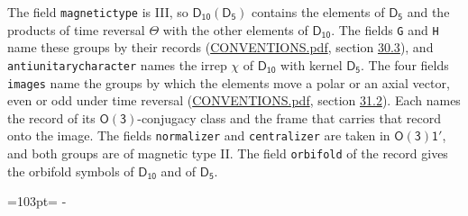 \documentclass[10pt,a4paper]{article}
\newcommand{\needspace}[1]{\par\penalty-100\begingroup\dimen0=#1\relax\dimen2=\pagegoal
  \advance\dimen2-\pagetotal\ifdim\dimen0>\dimen2\relax\ifdim\dimen2>0pt\vfil\break\fi\fi
  \endgroup}
\numberwithin{equation}{section}
\newcommand{\grp}[1]{\mathsf{#1}}
\begin{document}
The field \texttt{magnetictype} is III, so $\grp{D_{10}}(\grp{D_{5}})$ contains the elements of $\grp{D_{5}}$ and the products of time reversal $\varTheta$ with the other elements of $\grp{D_{10}}$. The fields \texttt{G} and \texttt{H} name these groups by their records (\href{../../CONVENTIONS.pdf}{CONVENTIONS.pdf}, section \href{../../CONVENTIONS.pdf\#conv.30.3}{30.3}), and \texttt{antiunitarycharacter} names the irrep $\chi$ of $\grp{D_{10}}$ with kernel $\grp{D_{5}}$. The four fields \texttt{images} name the groups by which the elements move a polar or an axial vector, even or odd under time reversal (\href{../../CONVENTIONS.pdf}{CONVENTIONS.pdf}, section \href{../../CONVENTIONS.pdf\#conv.31.2}{31.2}). Each names the record of its $\grp{O(3)}$-conjugacy class and the frame that carries that record onto the image. The fields \texttt{normalizer} and \texttt{centralizer} are taken in $\grp{O(3)1'}$, and both groups are of magnetic type II. The field \texttt{orbifold} of the record gives the orbifold symbols of $\grp{D_{10}}$ and of $\grp{D_{5}}$.
\needspace{103pt}
\end{document}
